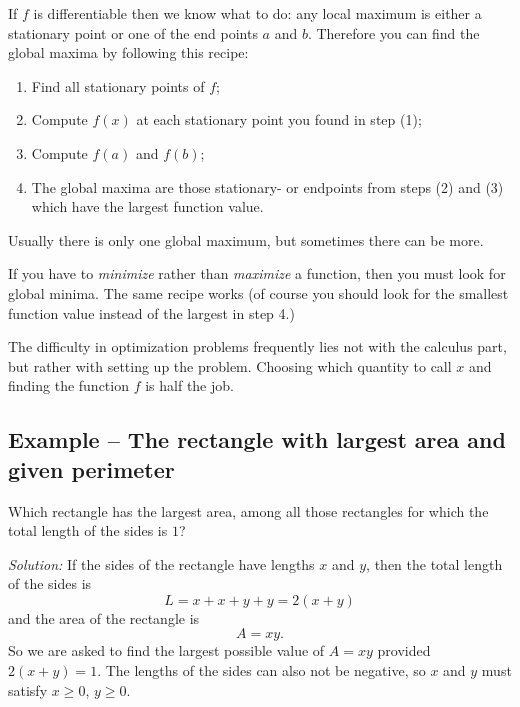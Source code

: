 If $f$ is differentiable then we know what to do: any local maximum is either a
stationary point or one of the end points $a$ and $b$.  Therefore you can find
the global maxima by following this recipe:
\begin{enumerate}\sffamily\itshape
\item Find all stationary points of $f$;
\item Compute $f(x)$ at each stationary point you found in step (1);
\item Compute $f(a)$ and $f(b)$;
\item The global maxima are those stationary- or endpoints from steps
  (2) and (3) which have the largest function value.
\end{enumerate}
Usually there is only one global maximum, but sometimes there can be more.

If you have to \textit{minimize} rather than \textit{maximize} a function, then
you must look for global minima.  The same recipe works (of course you should
look for the smallest function value instead of the largest in step 4.)

The difficulty in optimization problems frequently lies not with the calculus
part, but rather with setting up the problem.  Choosing which quantity to call
$x$ and finding the function $f$ is half the job.


\subsection{Example -- The rectangle with largest area and given perimeter}
Which rectangle has the largest area, among all those rectangles for which the
total length of the sides is $1$?

\textit{Solution: } If the sides of the rectangle have lengths $x$ and $y$, then
the total length of the sides is
\[
L = x+x+y+y = 2(x+y)
\]
and the area of the rectangle is
\[
A = xy.
\]
So we are asked to find the largest possible value of $A=xy$ provided
$2(x+y)=1$.  The lengths of the sides can also not be negative, so $x$
and $y$ must satisfy $x\geq0$, $y\geq0$.

